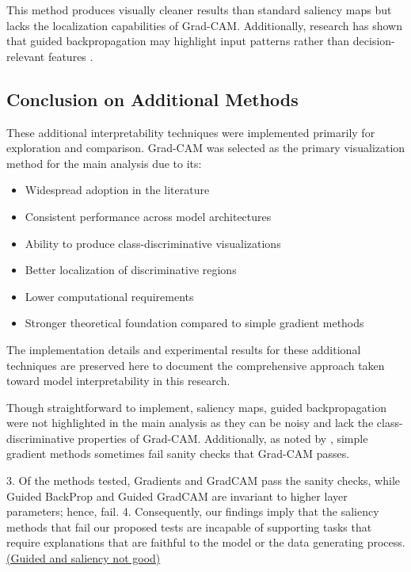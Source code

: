 \documentclass[a4paper,12pt]{report}
\begin{document}
This method produces visually cleaner results than standard saliency maps but lacks the localization capabilities of Grad-CAM. Additionally, research has shown that guided backpropagation may highlight input patterns rather than decision-relevant features \cite{nie2018theoretical}.

\subsection{Conclusion on Additional Methods}

These additional interpretability techniques were implemented primarily for exploration and comparison. Grad-CAM was selected as the primary visualization method for the main analysis due to its:

\begin{itemize}
    \item Widespread adoption in the literature
    \item Consistent performance across model architectures
    \item Ability to produce class-discriminative visualizations
    \item Better localization of discriminative regions
    \item Lower computational requirements
    \item Stronger theoretical foundation compared to simple gradient methods
\end{itemize}

The implementation details and experimental results for these additional techniques are preserved here to document the comprehensive approach taken toward model interpretability in this research.

Though straightforward to implement, saliency maps,  guided backpropagation were not highlighted in the main analysis as they can be noisy and lack the class-discriminative properties of Grad-CAM. Additionally, as noted by \cite{adebayo2018sanity}, simple gradient methods sometimes fail sanity checks that Grad-CAM passes.

3. Of the methods tested, Gradients and GradCAM pass the sanity checks, while Guided BackProp and
Guided GradCAM are invariant to higher layer parameters; hence, fail.
4. Consequently, our findings imply that the saliency methods that fail our proposed tests are incapable
of supporting tasks that require explanations that are faithful to the model or the data generating
process.  \href{https://arxiv.org/pdf/1810.03292}{(Guided and saliency not good)}
\end{document}
